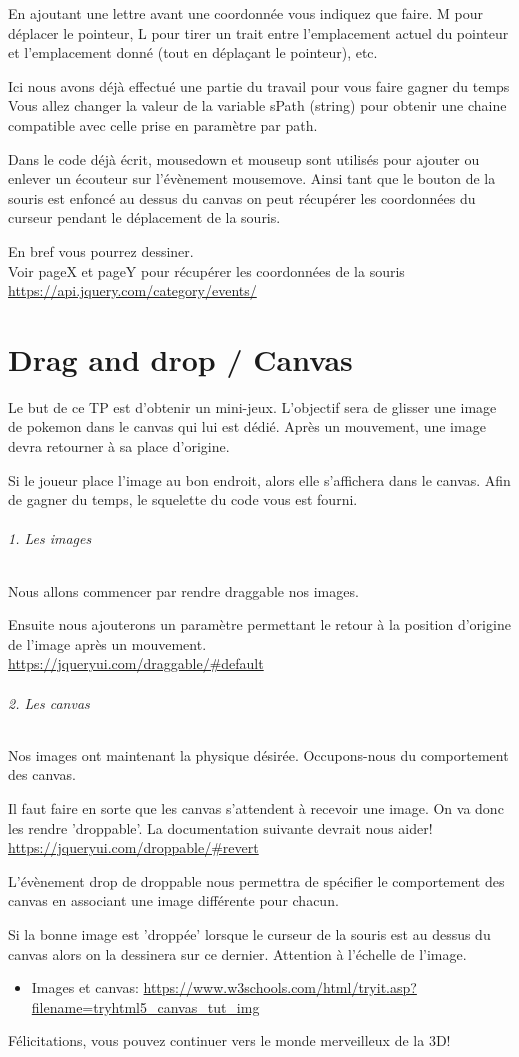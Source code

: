 \documentclass[a4paper,10pt]{report}
\begin{document}
En ajoutant une lettre avant une coordonnée vous indiquez que faire. M pour déplacer le pointeur, L pour tirer un trait entre l'emplacement actuel du pointeur et l'emplacement donné (tout en déplaçant le pointeur), etc.

Ici nous avons déjà effectué une partie du travail pour vous faire gagner du temps
Vous allez changer la valeur de la variable sPath (string) pour obtenir une chaine compatible avec celle prise en paramètre par path.

Dans le code déjà écrit, mousedown et mouseup sont utilisés pour ajouter ou enlever un écouteur sur l'évènement mousemove. Ainsi tant que le bouton de la souris est enfoncé au dessus du canvas on peut récupérer les coordonnées du curseur pendant le déplacement de la souris.

En bref vous pourrez dessiner.\\

Voir pageX et pageY pour récupérer les coordonnées de la souris\\
\url{https://api.jquery.com/category/events/}






\chapter{Drag and drop / Canvas}
Le but de ce TP est d'obtenir un mini-jeux. L'objectif sera de glisser une image de pokemon dans le canvas qui lui est dédié.
Après un mouvement, une image devra retourner à sa place d'origine.

Si le joueur place l'image au bon endroit, alors elle s'affichera dans le canvas.
Afin de gagner du temps, le squelette du code vous est fourni.

\subparagraph{1. Les images}
Nous allons commencer par rendre draggable nos images.

Ensuite nous ajouterons un paramètre permettant le retour à la position d'origine de l'image après un mouvement.\\
\url{https://jqueryui.com/draggable/#default}

\subparagraph{2. Les canvas}
Nos images ont maintenant la physique désirée. 
Occupons-nous du comportement des canvas.

Il faut faire en sorte que les canvas s'attendent à recevoir une image.
On va donc les rendre 'droppable'.
La documentation suivante devrait nous aider!\\
\url{https://jqueryui.com/droppable/#revert}

L'évènement drop de droppable nous permettra de spécifier le comportement des canvas en associant une image différente pour chacun.

Si la bonne image est 'droppée' lorsque le curseur de la souris est au dessus du canvas alors on la dessinera sur ce dernier. 
Attention à l'échelle de l'image.
\begin{itemize}
\item
Images et canvas: 
\url{https://www.w3schools.com/html/tryit.asp?filename=tryhtml5_canvas_tut_img}
\end{itemize}


Félicitations, vous pouvez continuer vers le monde merveilleux de la 3D!
\end{document}
